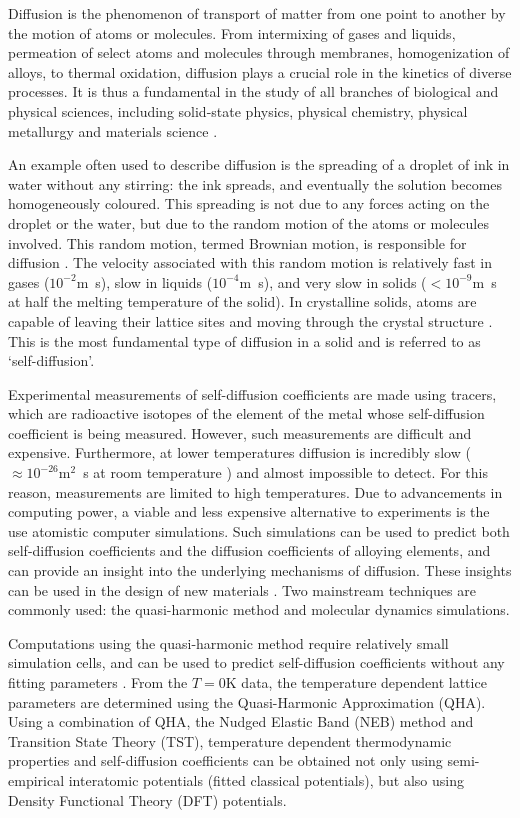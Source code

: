\documentclass{article}
\begin{document}
Diffusion is the phenomenon of transport of matter from one point to another by the motion of atoms or molecules. From intermixing of gases and liquids, permeation of select atoms and molecules through membranes, homogenization of alloys, to thermal oxidation, diffusion plays a crucial role in the kinetics of diverse processes. It is thus a fundamental in the study of all branches of biological and physical sciences, including solid-state physics, physical chemistry, physical metallurgy and materials science \cite{Mehrer2007}.

An example often used to describe diffusion is the spreading of a droplet of ink in water without any stirring: the ink spreads, and eventually the solution becomes homogeneously coloured. This spreading is not due to any forces acting on the droplet or the water, but due to the random motion of the atoms or molecules involved. This random motion, termed Brownian motion, is responsible for diffusion \cite{Einstein1905}. The velocity associated with this random motion is relatively fast in gases ($10^{-2}$m\si{\per\second}), slow in liquids ($10^{-4}$m\si{\per\second}), and very slow in solids ($<10^{-9}$m\si{\per\second} at half the melting temperature of the solid). In crystalline solids, atoms are capable of leaving their lattice sites and moving through the crystal structure \cite{Mehrer2007}. This is the most fundamental type of diffusion in a solid and is referred to as \enquote*{self-diffusion}.

Experimental measurements of self-diffusion coefficients are made using tracers, which are radioactive isotopes of the element of the metal whose self-diffusion coefficient is being measured. However, such measurements are difficult and expensive. Furthermore, at lower temperatures diffusion is incredibly slow ($\approx10^{-26}\text{m}^2$\si{\per\second} at room temperature \cite{Mantina2008}) and almost impossible to detect. For this reason, measurements are limited to high temperatures. Due to advancements in computing power, a viable and less expensive alternative to experiments is the use atomistic computer simulations. Such simulations can be used to predict both self-diffusion coefficients and the diffusion coefficients of alloying elements, and can provide an insight into the underlying mechanisms of diffusion. These insights can be used in the design of new materials \cite{Mishin2005}. Two mainstream techniques are commonly used: the quasi-harmonic method and molecular dynamics simulations.

Computations using the quasi-harmonic method require relatively small simulation cells, and can be used to predict self-diffusion coefficients without any fitting parameters \cite{Mantina2008}. From the $T=0$K data, the temperature dependent lattice parameters are determined using the Quasi-Harmonic Approximation (QHA). Using a combination of QHA, the Nudged Elastic Band (NEB) method and Transition State Theory (TST), temperature dependent thermodynamic properties and self-diffusion coefficients can be obtained not only using semi-empirical interatomic potentials (fitted classical potentials), but also using Density Functional Theory (DFT) potentials.
\end{document}
